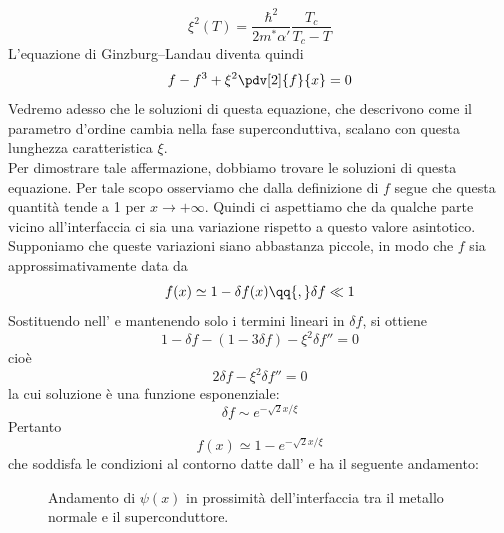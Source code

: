 \begin{equation*}
   \xi^2(T)
   = \frac{\hbar^2}{2m^* \alpha'} \frac{T_c}{T_c - T}
\end{equation*}
L'equazione di Ginzburg--Landau diventa quindi
\begin{equation}
   f - f^3 + \xi^2 \pdv[2]{f}{x} = 0
   \label{eq:ginzburg_landau_equation_1d_rewritten}
\end{equation}
Vedremo adesso che le soluzioni di questa equazione, che descrivono come il parametro d'ordine cambia nella fase superconduttiva, scalano con questa lunghezza caratteristica $\xi$.\\
Per dimostrare tale affermazione, dobbiamo trovare le soluzioni di questa equazione. Per tale scopo osserviamo che dalla definizione di $f$ segue che questa quantità tende a 1 per $x \to +\infty$. Quindi ci aspettiamo che da qualche parte vicino all'interfaccia ci sia una variazione rispetto a questo valore asintotico. Supponiamo che queste variazioni siano abbastanza piccole, in modo che $f$ sia approssimativamente data da
\begin{equation*}
   f(x) \simeq 1 - \delta f(x)
   \qq{,}
   \delta f \ll 1
\end{equation*}
Sostituendo nell' e mantenendo solo i termini lineari in $\delta f$, si ottiene
\begin{equation*}
   1 - \delta f - (1 - 3\delta f) - \xi^2 \delta f'' = 0
\end{equation*}
cioè
\begin{equation*}
   2 \delta f - \xi^2 \delta f'' = 0
\end{equation*}
la cui soluzione è una funzione esponenziale:
\begin{equation*}
   \delta f \sim e^{-\sqrt{2} x / \xi}
\end{equation*}
Pertanto
\begin{equation*}
   f(x) \simeq 1 - e^{-\sqrt{2} x / \xi}
\end{equation*}
che soddisfa le condizioni al contorno datte dall' e ha il seguente andamento:
\begin{figure}[H]
   \centering
   \caption*{Andamento di $\psi(x)$ in prossimità dell'interfaccia tra il metallo normale e il superconduttore.}
\end{figure}

